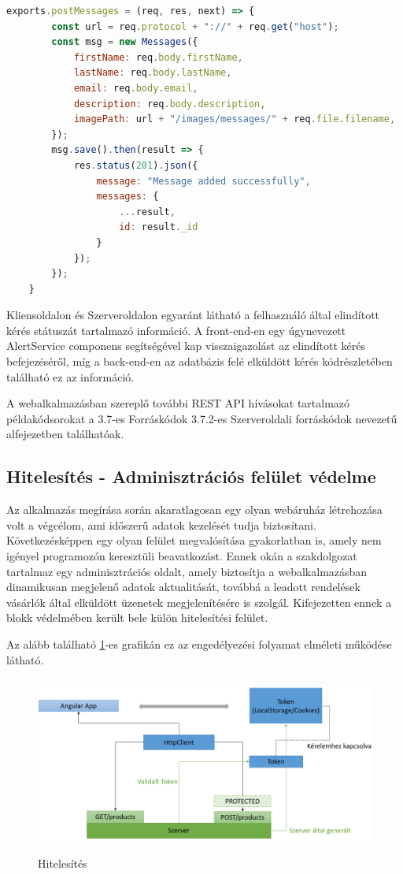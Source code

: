 \begin{lstlisting}[language=JavaScript]
	exports.postMessages = (req, res, next) => {
		const url = req.protocol + "://" + req.get("host");
		const msg = new Messages({
			firstName: req.body.firstName,
			lastName: req.body.lastName,
			email: req.body.email,
			description: req.body.description,
			imagePath: url + "/images/messages/" + req.file.filename,
		});
		msg.save().then(result => {
			res.status(201).json({
				message: "Message added successfully",
				messages: {
					...result,
					id: result._id
				}
			});
		});
	}
\end{lstlisting}

Kliensoldalon és Szerveroldalon egyaránt látható a felhasználó által elindított kérés státuszát tartalmazó információ. A front-end-en egy úgynevezett AlertService componens segítségével kap visszaigazolást az elindított kérés befejezéséről, míg a back-end-en az adatbázis felé elküldött kérés kódrészletében található ez az információ.

\bigskip
A webalkalmazásban szereplő további REST API hívásokat tartalmazó példakódsorokat a 3.7-es Forráskódok 3.7.2-es Szerveroldali forráskódok nevezetű alfejezetben találhatóak.

\subsection{Hitelesítés - Adminisztrációs felület védelme}
Az alkalmazás megírása során akaratlagosan egy olyan webáruház létrehozása volt a végcélom, ami időszerű adatok kezelését tudja biztosítani. Következésképpen egy olyan felület megvalósítása gyakorlatban is, amely nem igényel programozón keresztüli beavatkozást. Ennek okán a szakdolgozat tartalmaz egy adminisztrációs oldalt, amely biztosítja a webalkalmazásban dinamikusan megjelenő adatok aktualitását, továbbá a leadott rendelések vásárlók által elküldött üzenetek megjelenítésére is szolgál. Kifejezetten ennek a blokk védelmében került bele külön hitelesítési felület.

\bigskip
Az alább található \ref{fig.picture-9}-es grafikán ez az engedélyezési folyamat elméleti működése látható.
 
\begin{figure}[H]
	\centering
	\includegraphics[width=1.0\textwidth,height=220px]{images/hitelesites_bemutatasa.png}
	\caption{Hitelesítés}
	\label{fig.picture-9}
\end{figure}

